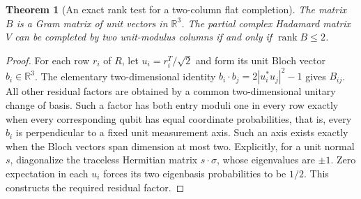 \documentclass[11pt]{article}
\newtheorem{theorem}{Theorem}[section]
\begin{document}
\begin{theorem}[An exact rank test for a two-column flat completion]
The matrix $B$ is a Gram matrix of unit vectors in $\mathbb R^3$.
The partial complex Hadamard matrix $V$ can be completed by two
unit-modulus columns if and only if $\operatorname{rank}B\le2$.
\end{theorem}
\begin{proof}
For each row $r_i$ of $R$, let $u_i=r_i^T/\sqrt2$ and form its unit
Bloch vector $b_i\in\mathbb R^3$. The elementary two-dimensional
identity $b_i\cdot b_j=2|u_i^*u_j|^2-1$ gives $B_{ij}$.
All other residual factors are obtained by a common two-dimensional
unitary change of basis. Such a factor has both entry moduli one
in every row exactly when every corresponding qubit has equal
coordinate probabilities, that is, every $b_i$ is perpendicular to
a fixed unit measurement axis. Such an axis exists exactly when
the Bloch vectors span dimension at most two. Explicitly, for a
unit normal $s$, diagonalize the traceless Hermitian matrix
$s\cdot\sigma$, whose eigenvalues are $\pm1$. Zero expectation in
each $u_i$ forces its two eigenbasis probabilities to be $1/2$.
This constructs the required residual factor.
\end{proof}
\end{document}
